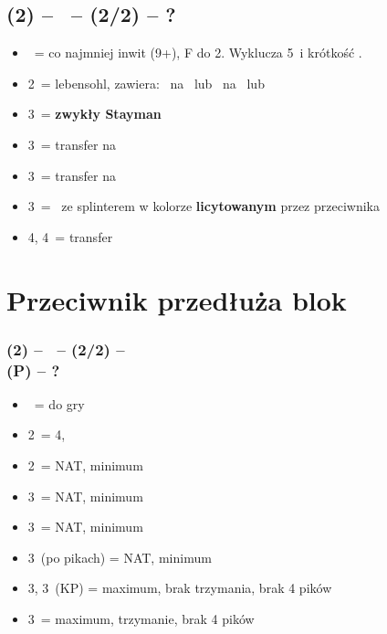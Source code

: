 \documentclass[12pt, a4paper]{article}
\begin{document}
\subsection*{(2\diams) -- \dbl\ -- (2\hearts/2\spades) -- ?}
\begin{itemize}
    \item \dbl\ = co najmniej inwit (9+), F do 2\nt. Wyklucza 5\hearts\spades\ i krótkość \hearts\spades.
    \item 2\nt\ = lebensohl, zawiera:
    \subitem \soff\ na \clubs\ lub \diams
    \subitem \inv\ na \hearts\ lub \spades
    \item 3\clubs\ = \textbf{zwykły Stayman} \vimp
    \item 3\diams\ = transfer na \hearts\ \gf
    \item 3\hearts\ = transfer na \spades\ \gf
    \item 3\spades\ = \gf\ ze splinterem w kolorze \textbf{licytowanym} przez przeciwnika
    \item 4\diams, 4\hearts\ = transfer
\end{itemize}


\section{Przeciwnik przedłuża blok}

\subsubsection*{(2\diams) -- \dbl\ -- (2\hearts/2\spades) -- \dbl \\ (P) -- ?}
\begin{itemize}
    \item \pass\ = do gry
    \item 2\spades\ = 4\spades, \fonce
    \item 2\nt\ = NAT, minimum
    \item 3\clubs\ = NAT, minimum
    \item 3\diams\ = NAT, minimum
    \item 3\hearts\ (po pikach) = NAT, minimum
    \item 3\hearts, 3\spades\ (KP) = maximum, brak trzymania, brak 4 pików
    \item 3\nt\ = maximum, trzymanie, brak 4 pików
\end{itemize}
\end{document}
